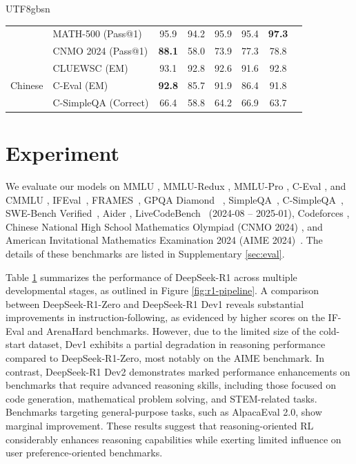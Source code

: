 \documentclass[11pt, a4paper, logo, copyright, nonumbering]{deepseek}
\begin{document}
\begin{CJK*}{UTF8}{gbsn}
\begin{table}[h]
\begin{tabular}{@{}c l | c c  c  c |c c@{}}
    & MATH-500 {\tiny (Pass@1)}   & 95.9 & 94.2 & 95.9 &  95.4 &  \textbf{97.3} \\
    & CNMO 2024 {\tiny (Pass@1)}  & \textbf{88.1} &58.0 & 73.9 & 77.3  &  {78.8} \\
    \midrule
    \multirow{3}{*}{Chinese} & CLUEWSC {\tiny (EM)}  & 93.1 & 92.8 & 92.6 &  91.6 &   {92.8}\\
    & C-Eval {\tiny (EM)}   & \textbf{92.8} & 85.7 & 91.9 &  86.4 &  {91.8}\\
     & C-SimpleQA {\tiny (Correct)} & 66.4 & 58.8 & 64.2 & 66.9 &  63.7 \\
    \bottomrule
    \end{tabular}
    
    \label{tab:stage_r1}
\end{table}

\section{Experiment}

 We evaluate our models on MMLU \citep{mmlu}, MMLU-Redux \citep{mmlu_redux}, MMLU-Pro \citep{mmlu_pro}, C-Eval \citep{ceval}, and CMMLU \citep{cmmlu}, IFEval~\citep{IFeval}, FRAMES~\citep{frames}, GPQA Diamond ~\citep{gpqa}, SimpleQA~\citep{simpleqa}, C-SimpleQA~\citep{csimpleqa}, SWE-Bench Verified~\citep{swe_verified}, Aider \citep{aider}, LiveCodeBench~\citep{livecodebench} (2024-08 -- 2025-01), Codeforces \citep{codeforces}, Chinese National High School Mathematics Olympiad (CNMO 2024) \citep{cnmo}, and American Invitational Mathematics Examination 2024 (AIME 2024)~\citep{AIME2024}. The details of these benchmarks are listed in Supplementary \ref{sec:eval}. 

Table \ref{tab:stage_r1} summarizes the performance of DeepSeek-R1 across multiple developmental stages, as outlined in Figure \ref{fig:r1-pipeline}. A comparison between DeepSeek-R1-Zero and DeepSeek-R1 Dev1 reveals substantial improvements in instruction-following, as evidenced by higher scores on the IF-Eval and ArenaHard benchmarks. However, due to the limited size of the cold-start dataset, Dev1 exhibits a partial degradation in reasoning performance compared to DeepSeek-R1-Zero, most notably on the AIME benchmark. In contrast, DeepSeek-R1 Dev2 demonstrates marked performance enhancements on benchmarks that require advanced reasoning skills, including those focused on code generation, mathematical problem solving, and STEM-related tasks. Benchmarks targeting general-purpose tasks, such as AlpacaEval 2.0, show marginal improvement. These results suggest that reasoning-oriented RL considerably enhances reasoning capabilities while exerting limited influence on user preference-oriented benchmarks.


\end{CJK*}
\end{document}
